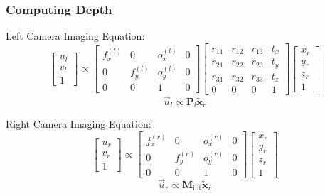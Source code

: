 \begin{frame}
    \frametitle{Computing Depth}
    Left Camera Imaging Equation:
    $$
    \begin{bmatrix} u_l \\ v_l \\ 1 \end{bmatrix} \propto
    \begin{bmatrix}
        f_x^{(l)} & 0 & o_x^{(l)} & 0 \\
        0 & f_y^{(l)} & o_y^{(l)} & 0 \\
        0 & 0 & 1 & 0
    \end{bmatrix}
    \begin{bmatrix}
        r_{11} & r_{12} & r_{13} & t_x \\
        r_{21} & r_{22} & r_{23} & t_y \\
        r_{31} & r_{32} & r_{33} & t_z \\
        0 & 0 & 0 & 1
    \end{bmatrix}
    \begin{bmatrix} x_r \\ y_r \\ z_r \\ 1 \end{bmatrix}
    $$
    $$\boxed{\vec{u}_l \propto \mathbf{P}_l \tilde{\mathbf{x}}_r}$$

    Right Camera Imaging Equation:
    $$
    \begin{bmatrix} u_r \\ v_r \\ 1 \end{bmatrix} \propto
    \begin{bmatrix}
        f_x^{(r)} & 0 & o_x^{(r)} & 0 \\
        0 & f_y^{(r)} & o_y^{(r)} & 0 \\
        0 & 0 & 1 & 0
    \end{bmatrix}
    \begin{bmatrix} x_r \\ y_r \\ z_r \\ 1 \end{bmatrix}
    $$
    $$\boxed{\vec{u}_r \propto \mathbf{M}_{\text{int}} \tilde{\mathbf{x}}_r}$$
\end{frame}

